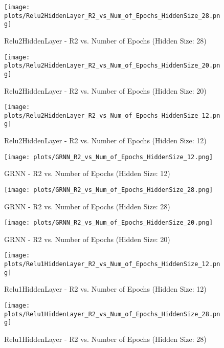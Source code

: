 
\begin{figure}[H]
    \centering
    \texttt{[image: plots/Relu2HiddenLayer\_R2\_vs\_Num\_of\_Epochs\_HiddenSize\_28.png]}
    \caption{Relu2HiddenLayer - R2 vs. Number of Epochs (Hidden Size: 28)}
\end{figure}

\begin{figure}[H]
    \centering
    \texttt{[image: plots/Relu2HiddenLayer\_R2\_vs\_Num\_of\_Epochs\_HiddenSize\_20.png]}
    \caption{Relu2HiddenLayer - R2 vs. Number of Epochs (Hidden Size: 20)}
\end{figure}

\begin{figure}[H]
    \centering
    \texttt{[image: plots/Relu2HiddenLayer\_R2\_vs\_Num\_of\_Epochs\_HiddenSize\_12.png]}
    \caption{Relu2HiddenLayer - R2 vs. Number of Epochs (Hidden Size: 12)}
\end{figure}

\begin{figure}[H]
    \centering
    \texttt{[image: plots/GRNN\_R2\_vs\_Num\_of\_Epochs\_HiddenSize\_12.png]}
    \caption{GRNN - R2 vs. Number of Epochs (Hidden Size: 12)}
\end{figure}

\begin{figure}[H]
    \centering
    \texttt{[image: plots/GRNN\_R2\_vs\_Num\_of\_Epochs\_HiddenSize\_28.png]}
    \caption{GRNN - R2 vs. Number of Epochs (Hidden Size: 28)}
\end{figure}

\begin{figure}[H]
    \centering
    \texttt{[image: plots/GRNN\_R2\_vs\_Num\_of\_Epochs\_HiddenSize\_20.png]}
    \caption{GRNN - R2 vs. Number of Epochs (Hidden Size: 20)}
\end{figure}

\begin{figure}[H]
    \centering
    \texttt{[image: plots/Relu1HiddenLayer\_R2\_vs\_Num\_of\_Epochs\_HiddenSize\_12.png]}
    \caption{Relu1HiddenLayer - R2 vs. Number of Epochs (Hidden Size: 12)}
\end{figure}

\begin{figure}[H]
    \centering
    \texttt{[image: plots/Relu1HiddenLayer\_R2\_vs\_Num\_of\_Epochs\_HiddenSize\_28.png]}
    \caption{Relu1HiddenLayer - R2 vs. Number of Epochs (Hidden Size: 28)}
\end{figure}

